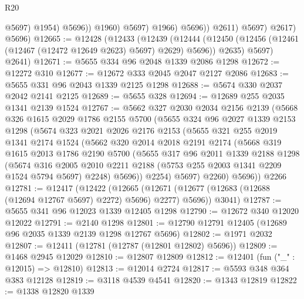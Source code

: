 \begin{lexlean}{R20}
\begin{coremodule}
                              @5697)
                            @1954)
                          @5696))
                      @1960)
                    @5697)
                  @1966)
                @5696))
            @2611)
          @5697)
        @2617)
      @5696)
@12665 := @12428
    (@12433
      (@12439
        (@12444 (@12450 (@12456 (@12461 (@12467 (@12472 @12649 @2623) @5697) @2629) @5696)) @2635)
        @5697)
      @2641)
@12671 := @5655 @334 @96 @2048 @1339 @2086 @1298
@12672 := @12272 @310
@12677 := @12672 @333 @2045 @2047 @2127 @2086
@12683 := @5655 @331 @96 @2043 @1339 @2125 @1298
@12688 := @5674 @330 @2037 @2042 @2141 @2125
@12689 := @5655 @328
@12694 := @12689 @255 @2035 @1341 @2139 @1524
@12767 := @5662
    @327
    @2030
    @2034
    @2156
    @2139
    (@5668
      @326
      @1615
      @2029
      @1786
      @2155
      @5700
      (@5655
        @324
        @96
        @2027
        @1339
        @2153
        @1298
        (@5674
          @323
          @2021
          @2026
          @2176
          @2153
          (@5655
            @321
            @255
            @2019
            @1341
            @2174
            @1524
            (@5662
              @320
              @2014
              @2018
              @2191
              @2174
              (@5668
                @319
                @1615
                @2013
                @1786
                @2190
                @5700
                (@5655
                  @317
                  @96
                  @2011
                  @1339
                  @2188
                  @1298
                  (@5674
                    @316
                    @2005
                    @2010
                    @2211
                    @2188
                    (@5753 @255 @2003 @1341 @2209 @1524 @5794 @5697)
                    @2248)
                  @5696))
              @2254)
            @5697)
          @2260)
        @5696))
    @2266
@12781 := @12417
    (@12422
      (@12665 (@12671 (@12677 (@12683 (@12688 (@12694 @12767 @5697) @2272) @5696) @2277) @5696))
      @3041)
@12787 := @5655 @341 @96 @12023 @1339 @12405 @1298
@12790 := @12672 @340 @12020 @12022
@12791 := @2140 @1298
@12801 := @12790 @12791 @12405 (@12689 @96 @2035 @1339 @2139 @1298 @12767 @5696)
@12802 := @1971 @2032
@12807 := @12411 (@12781 (@12787 (@12801 @12802) @5696))
@12809 := @1468 @2945 @12029
@12810 := @12807 @12809
@12812 := @12401 (fun ("_" : @12015) => @12810)
@12813 := @12014 @2724
@12817 := @5593 @348 @364 @383 @12128
@12819 := @3118 @4539 @4541
@12820 := @1343 @12819
@12822 := @1338 @12820 @1339

\end{coremodule}
\end{lexlean}
